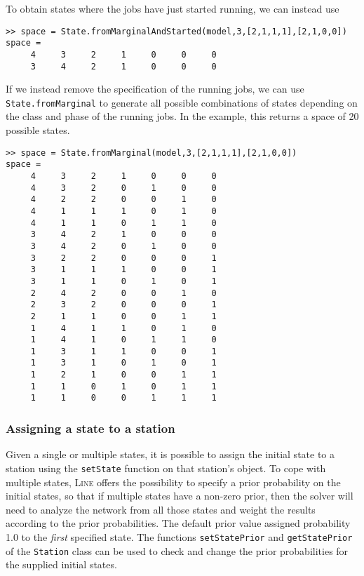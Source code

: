 To obtain states where the jobs have just started running, we can instead use
\begin{lstlisting}
>> space = State.fromMarginalAndStarted(model,3,[2,1,1,1],[2,1,0,0])
space =
     4     3     2     1     0     0     0
     3     4     2     1     0     0     0
\end{lstlisting}
If we instead remove the specification of the running jobs, we can use \texttt{State.fromMarginal} to generate all possible combinations of states depending on the class and phase of the running jobs. In the example, this returns a space of 20 possible states.
\begin{lstlisting}
>> space = State.fromMarginal(model,3,[2,1,1,1],[2,1,0,0])
space =
     4     3     2     1     0     0     0
     4     3     2     0     1     0     0
     4     2     2     0     0     1     0
     4     1     1     1     0     1     0
     4     1     1     0     1     1     0
     3     4     2     1     0     0     0
     3     4     2     0     1     0     0
     3     2     2     0     0     0     1
     3     1     1     1     0     0     1
     3     1     1     0     1     0     1
     2     4     2     0     0     1     0
     2     3     2     0     0     0     1
     2     1     1     0     0     1     1
     1     4     1     1     0     1     0
     1     4     1     0     1     1     0
     1     3     1     1     0     0     1
     1     3     1     0     1     0     1
     1     2     1     0     0     1     1
     1     1     0     1     0     1     1
     1     1     0     0     1     1     1
\end{lstlisting}
\subsubsection{Assigning a state to a station}
Given a single or multiple states, it is possible to assign the initial state to a station using the \texttt{setState} function on that station's object. To cope with multiple states, \textsc{Line} offers the possibility to specify a prior probability on the initial states, so that if multiple states have a non-zero prior, then the solver will need to analyze the network from all those states and weight the results according to the prior probabilities. The default prior value assigned probability 1.0 to the {\em first} specified state. The functions \texttt{setStatePrior} and \texttt{getStatePrior} of the \texttt{Station} class can be used to check and change the prior probabilities for the supplied initial states.

